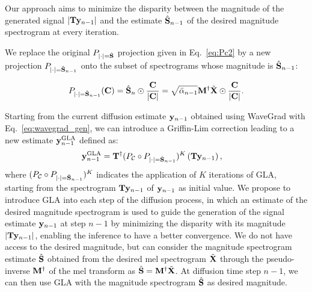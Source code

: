 Our approach aims to minimize the disparity between the magnitude of the generated signal $|\mathbf{T}\mathbf{y}_{n-1}|$ and the estimate  $\hat{\mathbf{S}}_{n-1}$ of the desired magnitude spectrogram at every iteration. 

We replace the original $P_{|\cdot|=\hat{\mathbf{S}}}$ projection given in Eq.~\eqref{eq:Pc2} by a new projection $P_{|\cdot|=\hat{\mathbf{S}}_{n-1}}$ onto the subset of spectrograms whose magnitude is $\hat{\mathbf{S}}_{n-1}$:

\begin{equation}
\begin{split}
    P_{|\cdot|=\hat{\mathbf{S}}_{n-1}}(\mathbf{C})&=\hat{\mathbf{S}}_n \odot \frac{\mathbf{C}}{\left|\mathbf{C}\right|} =\sqrt{\bar{\alpha}_{n-1}}\mathbf{M}^\dagger\tilde{\mathbf{X}} \odot\frac{\mathbf{C}}{\left|\mathbf{C}\right|}. \\
\end{split}
\label{equ-QC2}
\end{equation}

Starting from the current diffusion estimate $\mathbf{y}_{n-1}$ obtained using WaveGrad with Eq.~\eqref{eq:wavegrad_gen}, we can introduce a Griffin-Lim correction leading to a new estimate $\mathbf{y}_{n-1}^{\text{GLA}}$ defined as:
\begin{equation}
\begin{split}
   
   \mby_{n-1}^{\text{GLA}} & =\mbT^{\dagger} (P_{\mathcal{C}} \circ  P_{|\cdot|=\hat{\mbS}_{n-1}})^K \left(\mbT\mby_{n-1} \right),
   \label{eq:y_gla}
\end{split}
\end{equation}
where $(P_{\mathcal{C}} \circ  P_{|\cdot|=\hat{\mathbf{S}}_{n-1}})^K$ indicates the application of $K$ iterations of GLA, starting from the spectrogram $\mathbf{T}\mathbf{y}_{n-1}$ of $\mathbf{y}_{n-1}$ as initial value.
\else We propose to introduce GLA into each step of the diffusion process, in which an estimate of the desired magnitude spectrogram  is used to guide the generation of the signal estimate $\mathbf{y}_{n-1}$ at step $n-1$ by minimizing the disparity with its magnitude $|\mathbf{T}\mathbf{y}_{n-1}|$, enabling the inference to have a better convergence.
We do not have access to the desired magnitude, but can consider the magnitude spectrogram estimate $\hat{\mathbf{S}}$ obtained from the desired mel spectrogram $\tilde{\mathbf{X}}$ 
through the pseudo-inverse $\mathbf{M}^\dagger$ of the mel transform as $\hat{\mathbf{S}} = \mathbf{M}^\dagger \tilde{\mathbf{X}}$. 
At diffusion time step $n-1$, we can then use GLA with the magnitude spectrogram $\hat{\mathbf{S}}$ as desired magnitude.


